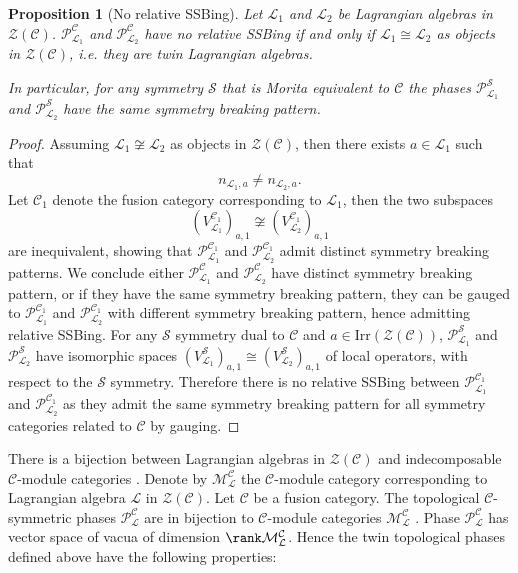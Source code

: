 \documentclass[aps,twocolumn,prx,floatfix,preprintnumbers, nofootinbib,10pt]{revtex4-2}
\numberwithin{equation}{section}
\newtheorem{proposition}[theorem]{Proposition}
\theoremstyle{definition}
\newcommand{\be}{\begin{equation}}
\newcommand{\ee}{\end{equation}}
\newcommand{\cC}{\mathcal{C}}
\newcommand{\cL}{\mathcal{L}}
\newcommand{\cM}{\mathcal{M}}
\newcommand{\cP}{\mathcal{P}}
\newcommand{\cS}{\mathcal{S}}
\newcommand{\cZ}{\mathcal{Z}}
\newcommand{\Irr}{\text{Irr}}
\begin{document}
\begin{proposition}[No relative SSBing]
\label{prop:no-hidden-SB}
    Let $\cL_1$ and $\cL_2$ be Lagrangian algebras in $\cZ(\cC)$. $\cP^{\cC}_{\cL_1}$ and $\cP^{\cC}_{\cL_2}$ have no relative SSBing
    if and only if $\cL_1 \cong \cL_2$ as objects in $\cZ(\cC)$, i.e. they are twin Lagrangian algebras.
    
    In particular, for any symmetry $\cS$ that is Morita equivalent to $\cC$ the phases $\cP^{\cS}_{\cL_1}$ and $\cP^{\cS}_{\cL_2}$ have the same symmetry breaking pattern. 
\end{proposition}
\begin{proof}
    Assuming $\cL_1\not\cong \cL_2$ as objects in $\cZ(\cC)$, then there exists $a\in \cL_1$ such that 
    \be
    n_{\cL_1,a}\neq n_{\cL_2,a}.
    \ee
    Let $\cC_1$ denote the fusion category corresponding to $\cL_1$, then the two subspaces 
    \be
        (V_{\cL_1}^{\cC_1})_{a,1} \not\cong (V_{\cL_2}^{\cC_1})_{a,1}
    \ee
    are inequivalent, showing that $\cP^{\cC_1}_{\cL_1}$ and $\cP^{\cC_1}_{\cL_2}$ admit distinct symmetry breaking patterns. We conclude either $\cP^{\cC}_{\cL_1}$ and $\cP^{\cC}_{\cL_2}$ have distinct symmetry breaking pattern, or if they have the same symmetry breaking pattern, they can be gauged to $\cP^{\cC_1}_{\cL_1}$ and $\cP^{\cC_1}_{\cL_2}$ with different symmetry breaking pattern, hence admitting relative SSBing. 
    For any $\cS$ symmetry dual to $\cC$ and $a\in \Irr(\cZ(\cC))$, $\cP^{\cS}_{\cL_1}$ and $\cP^{\cS}_{\cL_2}$ have isomorphic spaces $(V_{\cL_1}^{{\cS}})_{a,1}\cong (V_{\cL_2}^{{\cS}})_{a,1}$ of local operators, with respect to the $\cS$ symmetry. Therefore there is no relative SSBing between $\cP^{\cC_1}_{\cL_1}$ and $\cP^{\cC_1}_{\cL_2}$ as they admit the same symmetry breaking pattern for all symmetry categories related to $\cC$ by gauging. 
\end{proof}

There is a bijection between Lagrangian algebras in $\cZ(\cC)$ and indecomposable $\cC$-module categories \cite{davydov2013witt}. Denote by  $\cM_{\cL}^{\cC}$ the $\cC$-module category corresponding to Lagrangian algebra $\cL$ in $\cZ(\cC)$. 
Let $\cC$ be a fusion category. The topological $\cC$-symmetric phases $\cP^{\cC}_{\cL}$ are in bijection to $\cC$-module categories $\cM_{\cL}^{\cC}$ \cite{Thorngren:2019iar}. Phase $\cP^{\cC}_{\cL}$ has vector space of vacua of dimension $\rank \cM_{\cL}^{\cC}$.
Hence the twin topological phases defined above have the following properties:
\end{document}
